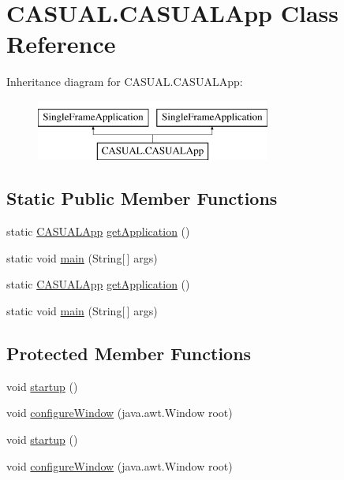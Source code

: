 \hypertarget{classCASUAL_1_1CASUALApp}{\section{C\-A\-S\-U\-A\-L.\-C\-A\-S\-U\-A\-L\-App Class Reference}
\label{classCASUAL_1_1CASUALApp}
}
Inheritance diagram for C\-A\-S\-U\-A\-L.\-C\-A\-S\-U\-A\-L\-App\-:\begin{figure}[H]
\begin{center}
\leavevmode
\includegraphics[height=2.000000cm]{classCASUAL_1_1CASUALApp}
\end{center}
\end{figure}
\subsection*{Static Public Member Functions}
\begin{DoxyCompactItemize}
\item 
static \hyperlink{classCASUAL_1_1CASUALApp}{C\-A\-S\-U\-A\-L\-App} \hyperlink{classCASUAL_1_1CASUALApp_a10428ae7a0decfd58a8089abba4c2ec3}{get\-Application} ()
\item 
static void \hyperlink{classCASUAL_1_1CASUALApp_ae70d2201eea0faed56373ae468d835a3}{main} (String\mbox{[}$\,$\mbox{]} args)
\item 
static \hyperlink{classCASUAL_1_1CASUALApp}{C\-A\-S\-U\-A\-L\-App} \hyperlink{classCASUAL_1_1CASUALApp_a10428ae7a0decfd58a8089abba4c2ec3}{get\-Application} ()
\item 
static void \hyperlink{classCASUAL_1_1CASUALApp_ae70d2201eea0faed56373ae468d835a3}{main} (String\mbox{[}$\,$\mbox{]} args)
\end{DoxyCompactItemize}
\subsection*{Protected Member Functions}
\begin{DoxyCompactItemize}
\item 
void \hyperlink{classCASUAL_1_1CASUALApp_a599fe9852fc5a20cfc144465ab9a6a06}{startup} ()
\item 
void \hyperlink{classCASUAL_1_1CASUALApp_adf38955dc957953f82eb4c0d2cefa6fe}{configure\-Window} (java.\-awt.\-Window root)
\item 
void \hyperlink{classCASUAL_1_1CASUALApp_a599fe9852fc5a20cfc144465ab9a6a06}{startup} ()
\item 
void \hyperlink{classCASUAL_1_1CASUALApp_adf38955dc957953f82eb4c0d2cefa6fe}{configure\-Window} (java.\-awt.\-Window root)
\end{DoxyCompactItemize}


